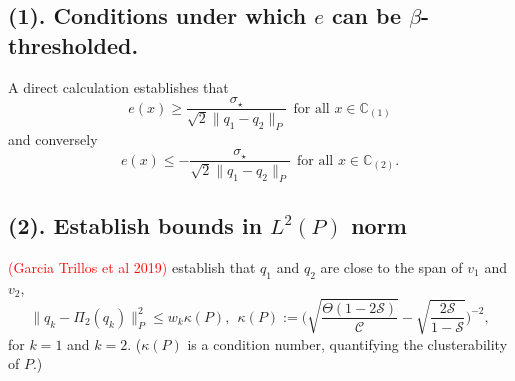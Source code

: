 \documentclass{article}
\newcommand{\1}{\mathbf{1}}
\newcommand{\Leb}{L}
\newcommand{\mc}[1]{\mathcal{#1}}
\theoremstyle{alden}
\theoremstyle{aldenthm}
\theoremstyle{definition}
\theoremstyle{remark}
\begin{document}
\subsection{(1). Conditions under which $e$ can be $\beta$-thresholded.}
A direct calculation establishes that
\begin{equation*}
e(x) \geq \frac{\sigma_{\star}}{\sqrt{2}\|q_1 - q_2\|_P}~~\textrm{for all $x \in \mathbb{C}_{(1)}$}
\end{equation*} 
and conversely
\begin{equation*}
e(x) \leq -\frac{\sigma_{\star}}{\sqrt{2}\|q_1 - q_2\|_P}~~\textrm{for all $x \in \mathbb{C}_{(2)}$}.
\end{equation*} 

\subsection{(2). Establish bounds in $\Leb^2(P)$ norm}
\textcolor{red}{(Garcia Trillos et al 2019)} establish that $q_1$ and $q_2$ are close to the span of $v_1$ and $v_2$, 
\begin{equation}
\label{eqn:garciatrillos19_1}
\|q_k - \Pi_2(q_k)\|_{P}^2 \leq w_k \kappa(P),~~\kappa(P) := \biggl(\sqrt{\frac{\Theta(1 - 2\mc{S})}{\mc{C}}} - \sqrt{\frac{2\mc{S}}{1 - \mc{S}}}\biggr)^{-2},
\end{equation}
for $k = 1$ and $k = 2$. ($\kappa(P)$ is a condition number, quantifying the clusterability of $P$.)
\end{document}
